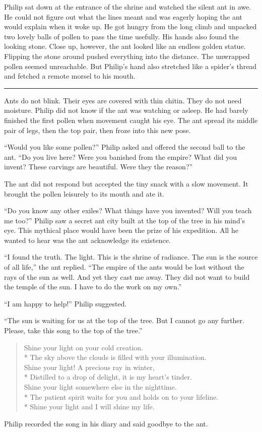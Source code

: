 \documentclass[10pt]{memoir}
\renewcommand{\pfbreakdisplay}{\bigskip \ding{166} \bigskip}
\newcommand{\secbreak}{\fancybreak{\pfbreakdisplay}}
\newcommand{\sunsong}{
  Shine your light on your cold creation. \\*
  The sky above the clouds is filled with your illumination. \\
  Shine your light! A precious ray in winter, \\*
  Distilled to a drop of delight, it is my heart's tinder. \\
  Shine your light somewhere else in the nighttime. \\*
  The patient spirit waits for you and holds on to your lifeline. \\*
  Shine your light and I will shine my life.
}
\begin{document}
Philip sat down at the entrance of the shrine and watched the silent ant in
awe. He could not figure out what the lines meant and was eagerly hoping the
ant would explain when it woke up. He got hungry from the long climb and
unpacked two lovely balls of pollen to pass the time usefully. His hands also
found the looking stone. Close up, however, the ant looked like an endless
golden statue. Flipping the stone around pushed everything into the distance.
The unwrapped pollen seemed unreachable. But Philip's hand also stretched like
a spider's thread and fetched a remote morsel to his mouth.

\secbreak

Ants do not blink. Their eyes are covered with thin chitin. They do not need
moisture. Philip did not know if the ant was watching or asleep. He had barely
finished the first pollen when movement caught his eye. The ant spread its
middle pair of legs, then the top pair, then froze into this new pose.

``Would you like some pollen?'' Philip asked and offered the second ball to the
ant. ``Do you live here? Were you banished from the empire? What did you
invent? These carvings are beautiful. Were they the reason?''

The ant did not respond but accepted the tiny snack with a slow movement. It
brought the pollen leisurely to its mouth and ate it.

``Do you know any other exiles? What things have you invented? Will you teach
me too?'' Philip saw a secret ant city built at the top of the tree in his
mind's eye. This mythical place would have been the prize of his expedition.
All he wanted to hear was the ant acknowledge its existence.

``I found the truth. The light. This is the shrine of radiance. The sun is the
source of all life,'' the ant replied. ``The empire of the ants would be lost
without the rays of the sun as well. And yet they cast me away. They did not
want to build the temple of the sun. I have to do the work on my own.''

``I am happy to help!'' Philip suggested.

``The sun is waiting for us at the top of the tree. But I cannot go any
further. Please, take this song to the top of the tree.''


\begin{verse}
\sunsong
\end{verse}


Philip recorded the song in his diary and said goodbye to the ant.
\end{document}
